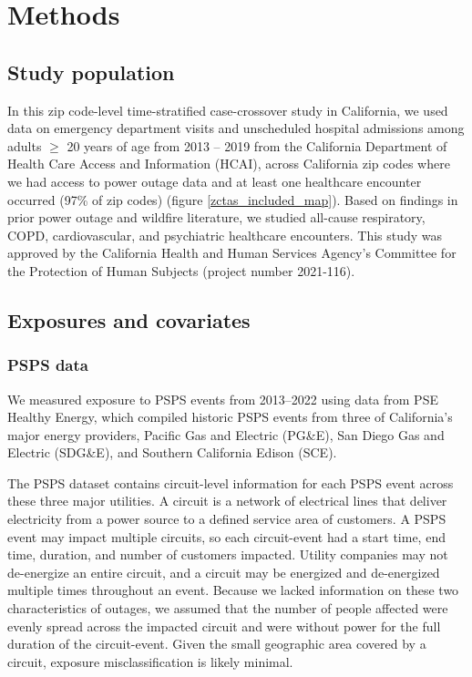 \documentclass[../main.tex]{subfiles}
\begin{document}
% 

\section{Methods}
\subsection{Study population}
In this zip code-level time-stratified case-crossover\citep{lumley2000bias} study in California, we used data on emergency department visits and unscheduled hospital admissions among adults $\geq$ 20 years of age from 2013 -- 2019 from the California Department of Health Care Access and Information (HCAI), \citep{hcai_datasets} across \nzipcodesinanalysis California zip codes where we had access to power outage data and at least one healthcare encounter occurred (97\% of zip codes) (figure \ref{zctas_included_map}). Based on findings in prior power outage and wildfire literature, we studied all-cause respiratory, COPD, cardiovascular, and psychiatric healthcare encounters.\citep{casey2020power, casey2024measuring} This study was approved by the California Health and Human Services Agency’s Committee for the Protection of Human Subjects (project number 2021-116).

\subsection{Exposures and covariates}

\subsubsection{PSPS data}
We measured exposure to PSPS events from 2013--2022 using data from PSE Healthy Energy, which compiled historic PSPS events from three of California's major energy providers, Pacific Gas and Electric (PG\&E), San Diego Gas and Electric (SDG\&E), and Southern California Edison (SCE).\citep{PSEHealthyEnergy_PSPS, cpuc_psps_2025} 

The PSPS dataset contains circuit-level information for each PSPS event across these three major utilities. A circuit is a network of electrical lines that deliver electricity from a power source to a defined service area of customers. A PSPS event may impact multiple circuits, so each circuit-event had a start time, end time, duration, and number of customers impacted.\citep{PSEHealthyEnergy_PSPS, cpuc_psps_2025} Utility companies may not de-energize an entire circuit, and a circuit may be energized and de-energized multiple times throughout an event. Because we lacked information on these two characteristics of outages, we assumed that the number of people affected were evenly spread across the impacted circuit and were without power for the full duration of the circuit-event. Given the small geographic area covered by a circuit, exposure misclassification is likely minimal.
\end{document}

